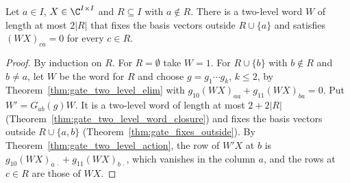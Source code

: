 \begin{theorem}
    \label{thm:gate_column_elim}
    \leanok
    Let $a\in I$, $X\in\C^{I\times I}$ and $R\subseteq I$ with $a\notin R$.
    There is a two-level word $W$ of length at most $2|R|$ that fixes the
    basis vectors outside $R\cup\{a\}$ and satisfies $(WX)_{ca}=0$ for every
    $c\in R$.
\end{theorem}
\begin{proof}\leanok
    By induction on $R$. For $R=\emptyset$ take $W=1$. For $R\cup\{b\}$ with
    $b\notin R$ and $b\neq a$, let $W$ be the word for $R$ and choose
    $g=g_1\cdots g_k$, $k\leq2$, by Theorem~\ref{thm:gate_two_level_elim}
    with $g_{10}(WX)_{aa}+g_{11}(WX)_{ba}=0$. Put $W'=G_{ab}(g)W$. It is a
    two-level word of length at most $2+2|R|$
    (Theorem~\ref{thm:gate_two_level_word_closure}) and fixes the basis
    vectors outside $R\cup\{a,b\}$ (Theorem~\ref{thm:gate_fixes_outside}).
    By Theorem~\ref{thm:gate_two_level_action}, the row of $W'X$ at $b$ is
    $g_{10}(WX)_{a\,\cdot}+g_{11}(WX)_{b\,\cdot}$, which vanishes in the
    column $a$, and the rows at $c\in R$ are those of $WX$.
\end{proof}

